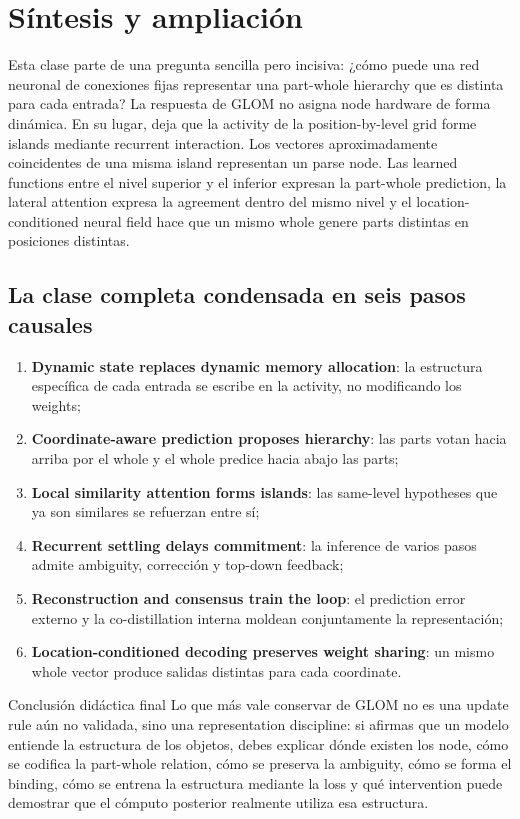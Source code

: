 \documentclass[a4paper]{article}
\begin{document}
\section{Síntesis y ampliación}

Esta clase parte de una pregunta sencilla pero incisiva: ¿cómo puede una red neuronal de conexiones fijas representar una part-whole hierarchy que es distinta para cada entrada? La respuesta de GLOM no asigna node hardware de forma dinámica. En su lugar, deja que la activity de la position-by-level grid forme islands mediante recurrent interaction. Los vectores aproximadamente coincidentes de una misma island representan un parse node. Las learned functions entre el nivel superior y el inferior expresan la part-whole prediction, la lateral attention expresa la agreement dentro del mismo nivel y el location-conditioned neural field hace que un mismo whole genere parts distintas en posiciones distintas.

\subsection{La clase completa condensada en seis pasos causales}

\begin{enumerate}
  \item \textbf{Dynamic state replaces dynamic memory allocation}: la estructura específica de cada entrada se escribe en la activity, no modificando los weights;
  \item \textbf{Coordinate-aware prediction proposes hierarchy}: las parts votan hacia arriba por el whole y el whole predice hacia abajo las parts;
  \item \textbf{Local similarity attention forms islands}: las same-level hypotheses que ya son similares se refuerzan entre sí;
  \item \textbf{Recurrent settling delays commitment}: la inference de varios pasos admite ambiguity, corrección y top-down feedback;
  \item \textbf{Reconstruction and consensus train the loop}: el prediction error externo y la co-distillation interna moldean conjuntamente la representación;
  \item \textbf{Location-conditioned decoding preserves weight sharing}: un mismo whole vector produce salidas distintas para cada coordinate.
\end{enumerate}

\begin{importantbox}{Conclusión didáctica final}
Lo que más vale conservar de GLOM no es una update rule aún no validada, sino una representation discipline: si afirmas que un modelo entiende la estructura de los objetos, debes explicar dónde existen los node, cómo se codifica la part-whole relation, cómo se preserva la ambiguity, cómo se forma el binding, cómo se entrena la estructura mediante la loss y qué intervention puede demostrar que el cómputo posterior realmente utiliza esa estructura.
\end{importantbox}
\end{document}
